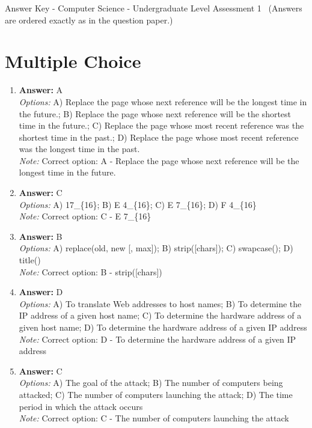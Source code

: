 \documentclass[12pt]{article}
\begin{document}
\begin{center}
Answer Key - Computer Science - Undergraduate Level Assessment 1 \
\small (Answers are ordered exactly as in the question paper.)
\end{center}

\section*{Multiple Choice}
\begin{enumerate}[label=\arabic*.]
\item \textbf{Answer:} A
\\ \textit{Options:} A) Replace the page whose next reference will be the longest time in the future.; B) Replace the page whose next reference will be the shortest time in the future.; C) Replace the page whose most recent reference was the shortest time in the past.; D) Replace the page whose most recent reference was the longest time in the past.
\\ \textit{Note:} Correct option: A - Replace the page whose next reference will be the longest time in the future.
\item \textbf{Answer:} C
\\ \textit{Options:} A) 17\_\{16\}; B) E 4\_\{16\}; C) E 7\_\{16\}; D) F 4\_\{16\}
\\ \textit{Note:} Correct option: C - E 7\_\{16\}
\item \textbf{Answer:} B
\\ \textit{Options:} A) replace(old, new [, max]); B) strip([chars]); C) swapcase(); D) title()
\\ \textit{Note:} Correct option: B - strip([chars])
\item \textbf{Answer:} D
\\ \textit{Options:} A) To translate Web addresses to host names; B) To determine the IP address of a given host name; C) To determine the hardware address of a given host name; D) To determine the hardware address of a given IP address
\\ \textit{Note:} Correct option: D - To determine the hardware address of a given IP address
\item \textbf{Answer:} C
\\ \textit{Options:} A) The goal of the attack; B) The number of computers being attacked; C) The number of computers launching the attack; D) The time period in which the attack occurs
\\ \textit{Note:} Correct option: C - The number of computers launching the attack
\end{enumerate}
\end{document}
